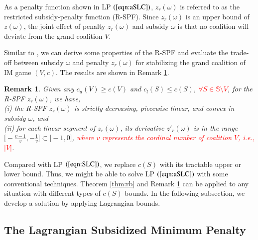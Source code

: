 \documentclass[authoryear,review,12pt]{elsarticle}
\newtheorem{remark}{Remark}
\begin{document}
As a penalty function shown in LP $(\ref{eqn:aSLC})$, $z_r(\omega)$ is referred to as the restricted subsidy-penalty function (R-SPF).
Since $z_r(\omega)$ is an upper bound of $z(\omega)$, the joint effect of penalty $z_r(\omega)$ and subsidy $\omega$ is that no coalition will deviate from the grand coalition $V$.


Similar to \cite{leastcore2018}, we can derive some properties of the R-SPF and evaluate the trade-off between subsidy $\omega$ and penalty $z_r(\omega)$ for stabilizing the grand coalition of IM game $(V,c)$.
The results are shown in Remark \ref{rem:convex}.

\begin{remark}\label{rem:convex}
Given any $c_u(V) \geq c(V)$ and $c_l(S) \leq c(S)$, \textcolor{red}{$\forall S \in \mathbb{S} \setminus V$}, for the R-SPF $z_r(\omega)$, we have,\\
(i) the R-SPF $z_r(\omega)$ is strictly decreasing, piecewise linear, and convex in subsidy $\omega$, and\\
(ii) for each linear segment of $z_r(\omega)$, its derivative $z'_r(\omega)$ is in the range $\big[ -\frac{v-1}{v}, -\frac{1}{v} \big] \subset \big[-1,0\big]$, \textcolor{red}{where $v$ represents the cardinal number of coalition $V$, i.e., $|V|$}.
\end{remark}


Compared with LP $(\ref{eqn:SLC})$, we replace $c(S)$ with its tractable upper or lower bound. Thus, we might be able to solve LP $(\ref{eqn:aSLC})$ with some conventional techniques.
Theorem \ref{thm:rb} and Remark \ref{rem:convex} can be applied to any situation with different types of $c(S)$ bounds.
In the following subsection, we develop a solution by applying Lagrangian bounds.


\subsection{The Lagrangian Subsidized Minimum Penalty}\label{section:CGBAM}
\end{document}

